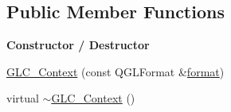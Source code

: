 \subsection*{Public Member Functions}
\begin{Indent}{\bf Constructor / Destructor}\par
\begin{DoxyCompactItemize}
\item 
\hyperlink{class_g_l_c___context_a51391e639a5909216e129745fb521947}{G\-L\-C\-\_\-\-Context} (const Q\-G\-L\-Format \&\hyperlink{glext_8h_a86f086d889f7cdb4d6461497ae891265}{format})
\item 
virtual \hyperlink{class_g_l_c___context_a1f91d4163e4ad4140b662fd0aeaa5f4b}{$\sim$\-G\-L\-C\-\_\-\-Context} ()
\end{DoxyCompactItemize}
\end{Indent}
